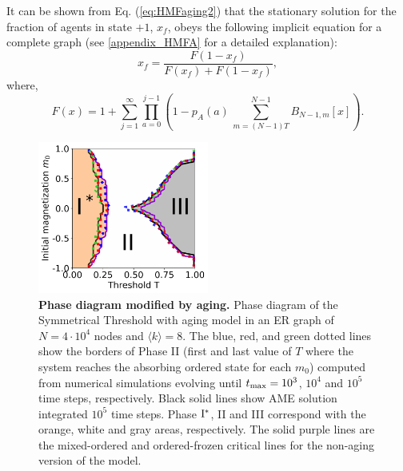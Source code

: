	It can be shown from Eq. (\ref{eq:HMFaging2}) that the stationary solution  for the fraction of agents in state $+1$, $x_f$, obeys the following implicit equation for a complete graph (see \ref{appendix_HMFA} for a detailed explanation):
	\begin{equation}
		x_f = \frac{F(1 - x_f)}{F(x_f) + F(1-x_f)},
		\label{eq:x_f}
	\end{equation}
	where,
	\begin{equation}
		F(x) = 1 + \sum_{j=1}^{\infty} \prod_{a=0}^{j-1} \left( 1 - p_A(a) \, \sum_{m = (N-1)T}^{N-1} B_{N-1,m}[x] \right).
		\label{eq:F(A)}
	\end{equation}
	
	\begin{figure}[t]
		 \centering
		 \includegraphics[width=0.5\textwidth]{Figs/Aging_STM/FIG5.pdf}
		 \caption{\label{ER_REG_PDAGING} \textbf{Phase diagram modified by aging.} Phase diagram of the Symmetrical Threshold with aging model in an ER graph of $N = 4 \cdot 10^4$ nodes and $\langle k \rangle = 8$. The blue, red, and green dotted lines show the borders of Phase II (first and last value of $T$ where the system reaches the absorbing ordered state for each $m_0$) computed from numerical simulations evolving until $t_{\rm max} = 10^3$, $10^4$ and $10^5$ time steps, respectively. Black solid lines show AME solution integrated $10^5$ time steps. Phase ${\rm I}^{*}$, II and III correspond with the orange, white and gray areas, respectively. The solid purple lines are the mixed-ordered and ordered-frozen critical lines for the non-aging version of the model.}
	\end{figure}
	
